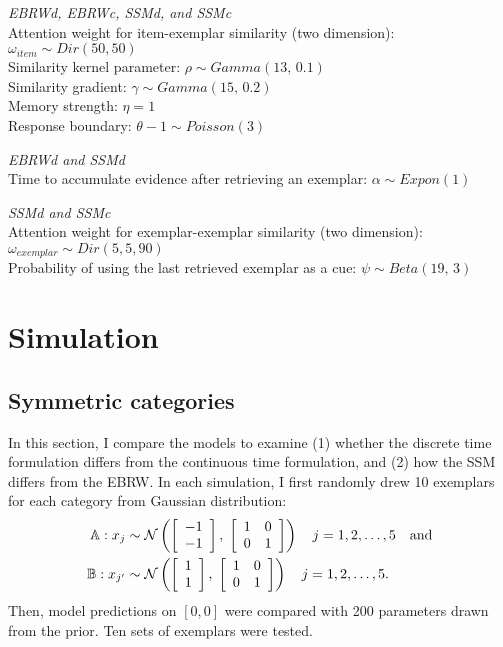 \documentclass[doc]{apa6}
\begin{document}
\smallskip
\noindent \emph{EBRWd, EBRWc, SSMd, and SSMc}\\
\indent Attention weight for item-exemplar similarity (two dimension): $\omega_{item} \sim Dir(50, 50)$\\
\indent Similarity kernel parameter: $\rho \sim Gamma(13,\, 0.1)$\\
\indent Similarity gradient: $\gamma \sim Gamma(15,\, 0.2)$\\
\indent Memory strength: $\eta = 1$\\
\indent Response boundary: $\theta - 1 \sim Poisson(3)$

\smallskip
\noindent \emph{EBRWd and SSMd}\\
\indent Time to accumulate evidence after retrieving an exemplar: $\alpha \sim Expon(1)$

\smallskip
\noindent \emph{SSMd and SSMc}\\
\indent Attention weight for exemplar-exemplar similarity (two dimension):\\
\indent \indent $\omega_{exemplar} \sim Dir(5, 5, 90)$\\
\indent Probability of using the last retrieved exemplar as a cue: $\psi \sim Beta(19,\, 3)$


\section{Simulation}

\subsection{Symmetric categories}

In this section, I compare the models to examine (1) whether the discrete time formulation differs
from the continuous time formulation, and (2) how the SSM differs from the EBRW\@. In each simulation,
I first randomly drew 10 exemplars for each category from Gaussian distribution:
\begin{align}
    \mathbb{A}: x_{j} &\sim \mathcal{N}\left(
        \left[ \begin{array}{c} -1\\-1 \end{array} \right], \;
        \left[ \begin{array}{c c} 1&0\\0&1 \end{array} \right]
        \right) \quad j = 1, 2, \dots, 5 \quad \mbox{and}\\
    \mathbb{B}: x_{j'} &\sim\mathcal{N}\left(%
        \left[ \begin{array}{c} 1\\1 \end{array} \right], \;
        \left[ \begin{array}{c c} 1&0\\0&1 \end{array} \right]
        \right) \quad j = 1, 2, \dots, 5.
\end{align}
Then, model predictions on $[0, 0]$ were compared with 200 parameters drawn from the prior. Ten
sets of exemplars were tested.
\end{document}
